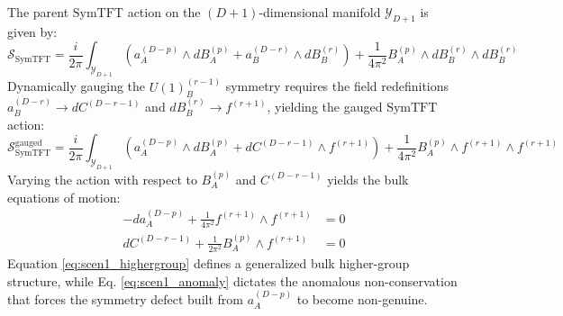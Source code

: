 \documentclass[aps,preprint,nofootinbib,preprintnumbers,eqsecnum,superscriptaddress]{revtex4}
\numberwithin{equation}{section}
\begin{document}
The parent $\text{SymTFT}$ action on the $(D+1)$-dimensional manifold $\mathcal{Y}_{D+1}$ is given by:
\begin{equation}
    \mathcal{S}_{\text{SymTFT}} = \frac{i}{2\pi} \int_{\mathcal{Y}_{D+1}} \left( a^{(D-p)}_A \wedge d B^{(p)}_A + a^{(D-r)}_B \wedge d B^{(r)}_B \right) + \frac{1}{4\pi^2} B^{(p)}_A \wedge d B^{(r)}_B \wedge d B^{(r)}_B
\end{equation}
Dynamically gauging the $U(1)^{(r-1)}_B$ symmetry requires the field redefinitions $a^{(D-r)}_B \to dC^{(D-r-1)}$ and $dB^{(r)}_B \to f^{(r+1)}$, yielding the gauged $\text{SymTFT}$ action:
\begin{equation}
    \mathcal{S}^\text{gauged}_{\text{SymTFT}} = \frac{i}{2\pi} \int_{\mathcal{Y}_{D+1}} \left( a^{(D-p)}_A \wedge d B^{(p)}_A + dC^{(D-r-1)} \wedge f^{(r+1)} \right) + \frac{1}{4\pi^2} B^{(p)}_A \wedge f^{(r+1)} \wedge f^{(r+1)}
\end{equation}
Varying the action with respect to $B^{(p)}_A$ and $C^{(D-r-1)}$ yields the bulk equations of motion:
\begin{align}
    -da^{(D-p)}_A + \frac{1}{4\pi^2} f^{(r+1)} \wedge f^{(r+1)} &= 0 \label{eq:scen1_anomaly} \\
    dC^{(D-r-1)} + \frac{1}{2\pi^2} B^{(p)}_A \wedge f^{(r+1)} &= 0 \label{eq:scen1_highergroup}
\end{align}
Equation \eqref{eq:scen1_highergroup} defines a generalized bulk higher-group structure, while Eq. \eqref{eq:scen1_anomaly} dictates the anomalous non-conservation that forces the symmetry defect built from $a^{(D-p)}_A$ to become non-genuine. 
\end{document}
